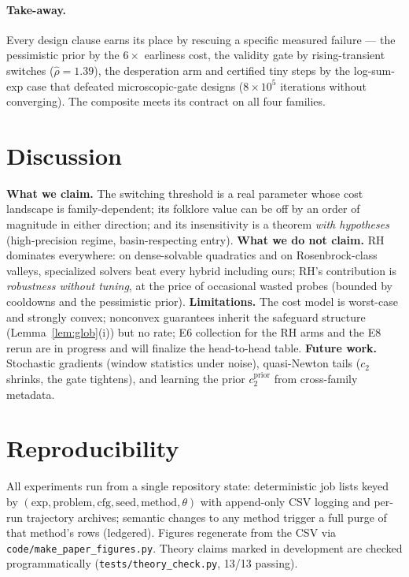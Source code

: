 ﻿\documentclass[10pt]{article}
\begin{document}
\paragraph{Take-away.} Every design clause earns its place by
rescuing a specific measured failure --- the pessimistic prior by the
$6\times$ earliness cost, the validity gate by rising-transient
switches ($\hat\rho=1.39$), the desperation arm and certified tiny
steps by the log-sum-exp case that defeated microscopic-gate designs
($8\times10^{5}$ iterations without converging). The composite meets
its contract on all four families.

\section{Discussion}\label{sec:disc}
\textbf{What we claim.} The switching threshold is a real parameter
whose cost landscape is family-dependent; its folklore value can be off
by an order of magnitude in either direction; and its insensitivity is
a theorem \emph{with hypotheses} (high-precision regime, basin-respecting
entry). \textbf{What we do not claim.} RH dominates everywhere: on
dense-solvable quadratics and on Rosenbrock-class valleys, specialized
solvers beat every hybrid including ours; RH's contribution is
\emph{robustness without tuning}, at the price of occasional wasted
probes (bounded by cooldowns and the pessimistic prior).
\textbf{Limitations.} The cost model is worst-case and strongly convex;
nonconvex guarantees inherit the safeguard structure
(Lemma~\ref{lem:glob}(i)) but no rate; E6 collection for the RH arms
and the E8 rerun are in progress and will finalize the head-to-head
table. \textbf{Future work.} Stochastic gradients (window statistics
under noise), quasi-Newton tails ($c_2$ shrinks, the gate tightens),
and learning the prior $c_2^{\mathrm{prior}}$ from cross-family
metadata.

\section*{Reproducibility}
All experiments run from a single repository state: deterministic job
lists keyed by $(\mathrm{exp},\mathrm{problem},\mathrm{cfg},
\mathrm{seed},\mathrm{method},\theta)$ with append-only CSV logging and
per-run trajectory archives; semantic changes to any method trigger a
full purge of that method's rows (ledgered). Figures regenerate from
the CSV via \texttt{code/make\_paper\_figures.py}. Theory claims marked
in development are checked programmatically
(\texttt{tests/theory\_check.py}, 13/13 passing).
\end{document}
